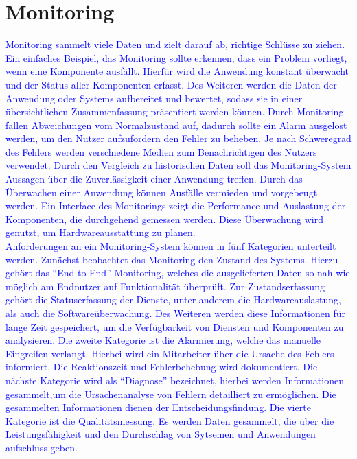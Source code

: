\section{Monitoring}\label{sec:monitoring}
\textcolor{blue}{
    Monitoring sammelt viele Daten und zielt darauf ab, richtige Schlüsse zu ziehen.
    Ein einfaches Beispiel, das Monitoring sollte erkennen, dass ein Problem vorliegt, wenn eine Komponente ausfällt.
    Hierfür wird die Anwendung konstant überwacht und der Status aller Komponenten erfasst.
    Des Weiteren werden die Daten der Anwendung oder Systems aufbereitet und bewertet, sodass sie in einer übersichtlichen Zusammenfassung präsentiert werden können.
    Durch Monitoring fallen Abweichungen vom Normalzustand auf, dadurch sollte ein Alarm ausgelöst werden, um den Nutzer aufzufordern den Fehler zu beheben.
    Je nach Schweregrad des Fehlers werden verschiedene Medien zum Benachrichtigen des Nutzers verwendet.
    Durch den Vergleich zu historischen Daten soll das Monitoring-System Aussagen über die Zuverlässigkeit einer Anwendung treffen.
    Durch das Überwachen einer Anwendung können Ausfälle vermieden und vorgebeugt werden.
    Ein Interface des Monitorings zeigt die Performance und Auslastung der Komponenten, die durchgehend gemessen werden.
    Diese Überwachung wird genutzt, um Hardwareausstattung zu planen.
    \\
    Anforderungen an ein Monitoring-System können in fünf Kategorien unterteilt werden.
    Zunächst beobachtet das Monitoring den Zustand des Systems.
    Hierzu gehört das \enquote{End-to-End}-Monitoring, welches die ausgelieferten Daten so nah wie möglich am Endnutzer auf Funktionalität überprüft.
    Zur Zustandserfassung gehört die Statuserfassung der Dienste, unter anderem die Hardwareauslastung, als auch die Softwareüberwachung.
    Des Weiteren werden diese Informationen für lange Zeit gespeichert, um die Verfügbarkeit von Diensten und Komponenten zu analysieren.
    Die zweite Kategorie ist die Alarmierung, welche das manuelle Eingreifen verlangt.
    Hierbei wird ein Mitarbeiter über die Ursache des Fehlers informiert.
    Die Reaktionszeit und Fehlerbehebung wird dokumentiert.
    Die nächste Kategorie wird als \enquote{Diagnose} bezeichnet, hierbei werden Informationen gesammelt,um die Ursachenanalyse von Fehlern detailliert zu ermöglichen.
    Die gesammelten Informationen dienen der Entscheidungsfindung.
    Die vierte Kategorie ist die Qualitätsmessung.
    Es werden Daten gesammelt, die über die Leistungsfähigkeit und den Durchschlag von Sytsemen und Anwendungen aufschluss geben.
}
